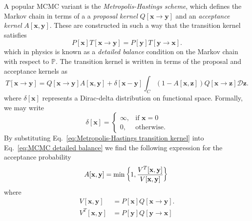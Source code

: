 A popular MCMC variant is the \textit{Metropolis-Hastings scheme}\citep{metropolisEquationStateCalculations1953a, hastingsMonteCarloSampling1970c}, which defines the Markov chain in terms of a a \textit{proposal kernel} $Q[\mathbf{x} \to \mathbf{y}]$ and an \textit{acceptance kernel} $A[\mathbf{x}, \mathbf{y}]$. These are constructed in such a way that the transition kernel satisfies
\begin{equation} \label{eq:MCMC detailed balance}
P[\mathbf{x}] T[\mathbf{x} \to \mathbf{y}]  = P[\mathbf{y}] T[\mathbf{y} \to \mathbf{x}] .
\end{equation}
which in physics is known as a \textit{detailed balance} condition on the Markov chain with respect to $\mathbb{P}$. The transition kernel is written in terms of the proposal and acceptance kernels as
\begin{equation} \label{eq:Metropolis-Hastings transition kernel}
T[\mathbf{x} \to \mathbf{y}]  = Q[\mathbf{x} \to \mathbf{y}] A[\mathbf{x}, \mathbf{y}] 
+ \delta[\mathbf{x} - \mathbf{y}] \int_C (1 - A[\mathbf{x}, \mathbf{z}]) Q[\mathbf{x} \to \mathbf{z}] \mathcal{D}\mathbf{z}.
\end{equation}
where $\delta[\mathbf{x}]$ represents a Dirac-delta distribution on functional space. Formally, we may write
\begin{equation}
	\delta[\mathbf{x}] = \begin{cases}
		\infty, & \text{if } \mathbf{x} = 0 \\
		0, & \text{otherwise}.
	\end{cases}
\end{equation}
By substituting Eq.~\ref{eq:Metropolis-Hastings transition kernel} into Eq.~\ref{eq:MCMC detailed balance} we find the following expression for the acceptance probability
\begin{equation} \label{eq:MCMC acceptance probability (non rigorous)}
	A[\mathbf{x}, \mathbf{y}] = \text{min}\left\{ 1,
\frac{V^T[\mathbf{x}, \mathbf{y}]}{V[\mathbf{x}, \mathbf{y}]}
\right\} \\
\end{equation}
where
\begin{subequations} \label{eq:forward and backward measures}
\begin{align}
V[\mathbf{x}, \mathbf{y}] & = P[\mathbf{x}] Q[\mathbf{x} \to \mathbf{y}]. \\
V^T[\mathbf{x}, \mathbf{y}] & = P[\mathbf{y}] Q[\mathbf{y} \to \mathbf{x}]
\end{align}
\end{subequations}
